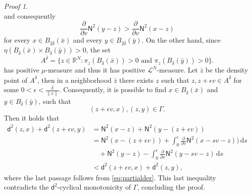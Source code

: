 \documentclass[11pt,twoside,a4paper]{article}
\newcommand{\norm}[1]{\left\lVert#1\right\rVert}
\newcommand{\Leb}{\mathscr{L}}
\newcommand{\R}{\mathbb{R}}
\newcommand{\de}{\ensuremath{\, \mathrm d}} %
\newcommand{\thmsymbol}{\( \square \)}
\newcommand{\di}{\mathsf d} %
\theoremstyle{theorem}
\theoremstyle{definition}
\theoremstyle{remark}
\theoremstyle{proof}
\newtheorem*{pro}{Proof}
\newenvironment{pr}{\begin{pro}%
 \renewcommand{\qedsymbol}{\thmsymbol}\pushQED{\qed}}%
 {\popQED\end{pro}}
\begin{document}
\begin{pr}
\begin{equation*}
\end{equation*}
and consequently 
\begin{equation}\label{eq:partialder}
    \frac{\partial}{\partial v}\mathsf N^2 ( y-z) > \frac{\partial}{\partial v}\mathsf N^2 ( x-z) 
\end{equation}
for every $x \in B_{2 \bar \delta}(\bar x)$ and every $y \in B_{2\bar \delta}(\bar y)$. 
On the other hand, since $\eta (B_{\bar \delta} (\bar x)\times B_{\bar \delta} (\bar y))>0$, the set 
\begin{equation*}
    A^{\bar \delta} = \{ z \in \R^N : \pi_z (B_{\bar \delta} (\bar x))>0 \text{ and }\pi_z (B_{\bar \delta} (\bar y))>0\}.
\end{equation*}
has positive $\mu$-measure and thus it has positive $\Leb^N$-measure. Let $\bar z$ be the density point of $A^{\bar \delta}$, then in a neighborhood $\bar z$ there exists $z$ such that $z, z+ \epsilon v \in A^{\bar \delta}$ for some $0<\epsilon < \frac{\bar \delta}{\norm{v}}$. Consequently, it is possible to find $x\in B_{\bar \delta} (\bar x)$ and $y \in B_{\bar \delta} (\bar y)$, such that 
\begin{equation*}
    (z+ \epsilon v, x), (z,y) \in \Gamma.
\end{equation*}
Then it holds that 
\begin{align*}
    \di ^2(z,x) + \di^2 (z + \epsilon v,y) &= \mathsf N^2(x-z) +\mathsf N^2 (y-(z+\epsilon v))\\
    & =\mathsf N^2 (x-(z+\epsilon v)) + \int_0^\epsilon \frac{\partial}{\partial v}\mathsf N^2 (x-sv-z)) \de s\\
    & \quad +\mathsf N^2 (y-z) - \int_0^\epsilon \frac{\partial}{\partial v} \mathsf N^2 (y-sv-z) \de s \\
    & < \di ^2(z+ \epsilon v,x) + \di^2 (z ,y),
\end{align*}
where the last passage follows from \eqref{eq:partialder}. This last inequality contradicts the $\di^2$-cyclical monotonicity of $\Gamma$, concluding the proof.
\end{pr}
\end{document}
